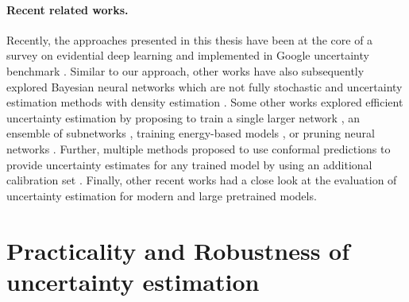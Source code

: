 \paragraph{Recent related works.} Recently, the approaches presented in this thesis have been  at the core of a survey on evidential deep learning \cite{survey_evidential_uncertainty} and implemented in Google uncertainty benchmark \cite{nado2021uncertainty}. Similar to our approach, other works have also subsequently explored Bayesian neural networks which are not fully stochastic \cite{bnnfullystochastic2022sharma} and uncertainty estimation methods with density estimation \cite{du2022vos, postels2020hiddenuncertainty, uncertainty-generative-classifier}. Some other works explored efficient uncertainty estimation by proposing to train a single larger network \cite{abe2022deep}, an ensemble of subnetworks \cite{mimo-independent-subnetworks}, training energy-based models \cite{ood_ebm}, or pruning neural networks \cite{ayle2022robustness-sparse}. Further, multiple methods proposed to use conformal predictions to provide uncertainty estimates for any trained model by using an additional calibration set \cite{conformal-survey, Park2020PAC}. Finally, other recent works \cite{minderer2021revisiting, tran2022plex} had a close look at the evaluation of uncertainty estimation for modern and large pretrained models.


\section{Practicality and Robustness of uncertainty estimation} 

